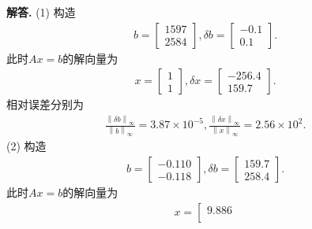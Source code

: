\documentclass[12pt, a4paper, oneside, UTF8]{ctexart}
\newenvironment{solution}{\par\noindent\textbf{解答. }}{\par}
\begin{document}
\begin{solution}
    (1) 构造
    \begin{align*}
        b = \left[
            \begin{array}{cccc}	
                1597\\
                2584
            \end{array}
        \right],
        \delta{b} = \left[
            \begin{array}{cccc}	
                -0.1\\
                0.1
            \end{array}
        \right].
    \end{align*}
    此时$Ax=b$的解向量为
    \begin{align*}
        x = \left[
            \begin{array}{cccc}	
                1\\
                1
            \end{array}
        \right],
        \delta{x} = \left[
            \begin{array}{cccc}	
                -256.4\\
                159.7
            \end{array}
        \right].
    \end{align*}
    相对误差分别为
    \begin{align*}
        \frac{{\left\lVert{\delta{b}}\right\rVert}_{\infty}}{{\left\lVert{b}\right\rVert}_{\infty}}={3.87\times{10^{-5}}},
        \frac{{\left\lVert{\delta{x}}\right\rVert}_{\infty}}{{\left\lVert{x}\right\rVert}_{\infty}}={2.56\times{10^{2}}}.
    \end{align*}
    (2) 构造
    \begin{align*}
        b = \left[
            \begin{array}{cccc}	
                -0.110\\
                -0.118
            \end{array}
        \right],
        \delta{b} = \left[
            \begin{array}{cccc}	
                159.7\\
                258.4
            \end{array}
        \right].
    \end{align*}
    此时$Ax=b$的解向量为
    \begin{align*}
        x = \left[
            \begin{array}{cccc}	
                9.886\\

\end{array}
\end{align*}
\end{solution}
\end{document}
